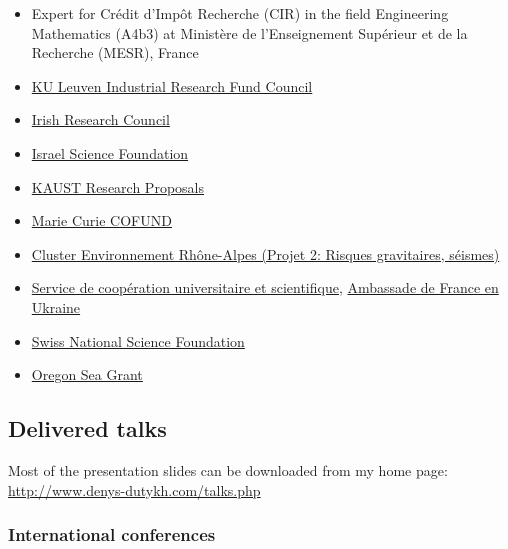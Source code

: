 \documentclass[final, a4paper, oneside, 12pt]{article}
\numberwithin{equation}{section}
\begin{document}
  \begin{itemize}

    \item Expert for Cr\'edit d'Imp\^ot Recherche (CIR) in the field Engineering Mathematics (A4b3) at Minist\`ere de l'Enseignement Sup\'erieur et de la Recherche (MESR), France

    \item \href{https://research.kuleuven.be/en/collaborate/science_business/iof/}{KU Leuven Industrial Research Fund Council}
  
    \item \href{http://research.ie/}{Irish Research Council}
    
    \item \href{https://www.isf.org.il/}{Israel Science Foundation}
    
    \item \href{https://www.kaust.edu.sa/en}{KAUST Research Proposals}
  
    \item \href{http://www.ulg.ac.be/cms/rv_2913816/en/about}{Marie Curie COFUND}
    
    \item \href{http://www.cluster-environnement.net/le-programme-scientifique/les-projets}%
    {Cluster Environnement Rh\^one-Alpes (Projet 2: Risques gravitaires, s\'eismes)}
    
    \item \href{http://ambafrance-ua.org/spip.php?article1409}%
    {Service de coop\'eration universitaire et scientifique}, \href{http://ambafrance-ua.org/spip.php?article1409}%
    {Ambassade de France en Ukraine}

    \item \href{https://www.snf.ch/en/}{Swiss National Science Foundation}
    
    \item \href{http://seagrant.oregonstate.edu/}{Oregon Sea Grant}
    
  \end{itemize}
  
\subsection{Delivered talks}

Most of the presentation slides can be downloaded from my home page: \\
\url{http://www.denys-dutykh.com/talks.php}

\subsubsection{International conferences}
\end{document}
